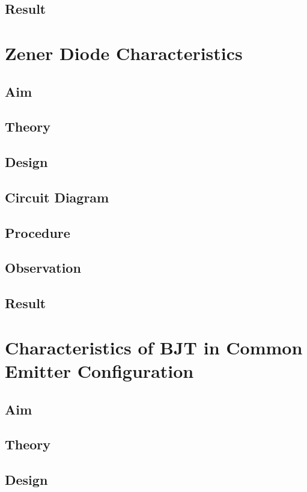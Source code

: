 \documentclass{book}
\begin{document}
\section*{Result}

\chapter[Characteristics of Zener Diodes]{Zener Diode Characteristics}

\section*{Aim}
\section*{Theory}
\section*{Design}
\section*{Circuit Diagram}
\section*{Procedure}
\section*{Observation}
\section*{Result}

\chapter[Characteristics of BJT in Common Emitter Configuration]{Characteristics of BJT in Common Emitter Configuration}
\section*{Aim}
\section*{Theory}
\section*{Design}
\end{document}
